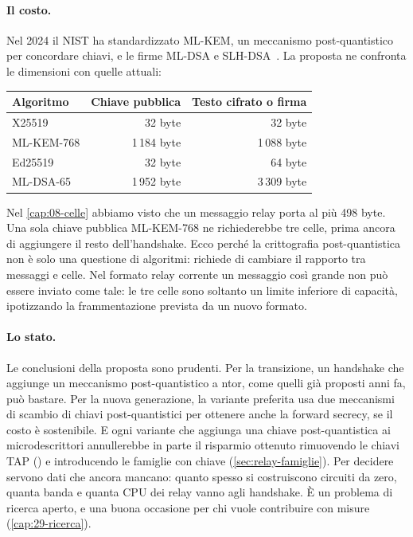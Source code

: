 \paragraph{Il costo.} Nel 2024 il NIST ha standardizzato ML-KEM, un meccanismo post-quantistico per concordare chiavi, e le firme ML-DSA e SLH-DSA~\cite{nistpqc2024}. La proposta ne confronta le dimensioni con quelle attuali:
\begin{center}\small
\begin{tabular}{@{}lrr@{}}
\toprule
Algoritmo & Chiave pubblica & Testo cifrato o firma \\
\midrule
X25519 & 32 byte & 32 byte \\
ML-KEM-768 & 1\,184 byte & 1\,088 byte \\
Ed25519 & 32 byte & 64 byte \\
ML-DSA-65 & 1\,952 byte & 3\,309 byte \\
\bottomrule
\end{tabular}
\end{center}
Nel \cref{cap:08-celle} abbiamo visto che un messaggio relay porta al più 498 byte. Una sola chiave pubblica ML-KEM-768 ne richiederebbe tre celle, prima ancora di aggiungere il resto dell'handshake. Ecco perché la crittografia post-quantistica non è solo una questione di algoritmi: richiede di cambiare il rapporto tra messaggi e celle. Nel formato relay corrente un messaggio così grande non può essere inviato come tale: le tre celle sono soltanto un limite inferiore di capacità, ipotizzando la frammentazione prevista da un nuovo formato.

\paragraph{Lo stato.} Le conclusioni della proposta sono prudenti. Per la transizione, un handshake che aggiunge un meccanismo post-quantistico a ntor, come quelli già proposti anni fa, può bastare. Per la nuova generazione, la variante preferita usa due meccanismi di scambio di chiavi post-quantistici per ottenere anche la forward secrecy, se il costo è sostenibile. E ogni variante che aggiunga una chiave post-quantistica ai microdescrittori annullerebbe in parte il risparmio ottenuto rimuovendo le chiavi TAP () e introducendo le famiglie con chiave (\cref{sec:relay-famiglie}). Per decidere servono dati che ancora mancano: quanto spesso si costruiscono circuiti da zero, quanta banda e quanta CPU dei relay vanno agli handshake. È un problema di ricerca aperto, e una buona occasione per chi vuole contribuire con misure (\cref{cap:29-ricerca}).

